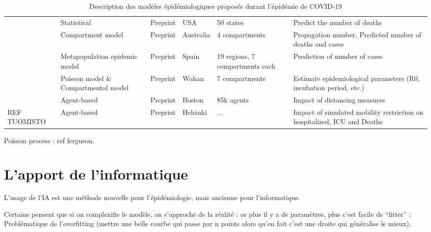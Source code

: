 \documentclass[review]{elsarticle}
\begin{document}
\begin{table}
\begin{adjustbox}{center}
{\begin{tabular}{p{4cm}|p{4cm}|p{2cm}|p{2cm}|p{4cm}|p{11cm}}
  \citet{woody_projections_2020} & Statistical & Preprint & USA & 50 states & Predict the number of deaths  \\
  \citet{platen_stochastic_2020} & Compartment model & Preprint & Australia & 4 compartments & Propagation number, Predicted number of deaths and cases  \\
  \citet{arenas_mathematical_2020} & Metapopulation epidemic model & Preprint & Spain & 19 regions, 7 compartments each & Prediction of number of cases  \\
  \citet{sanche_high_2020} & Poisson model \& Compartmental model & Preprint & Wuhan & 7 compartments & Estimate epidemiological parameters (R0, incubation period, etc.)  \\
  \citet{aleta_modeling_2020} & Agent-based & Preprint & Boston & 85k agents & Impact of distancing measures  \\
  REF TUOMISTO & Agent-based & Preprint & Helsinki & ... & Impact of simulated 	mobility restriction on hospitalized, ICU and Deaths \\

\end{tabular}}
\end{adjustbox}
\caption{Description des modèles épidémiologiques proposés durant l'épidémie de COVID-19}
\label{table:1}
\end{table}


Poisson process : ref ferguson.


\section{L'apport de l'informatique}

L'usage de l'IA est une méthode nouvelle pour l'épidémiologie, mais ancienne pour l'informatique.


Certains pensent que si on complexifie le modèle, on s'approche de la réalité : or plus il y a de paramètres, plus c'est facile de ``fitter'' : Problématique de l'overfitting (mettre une belle courbe qui passe par n points alors qu'en fait c'est une droite qui généralise le mieux).
\end{document}
